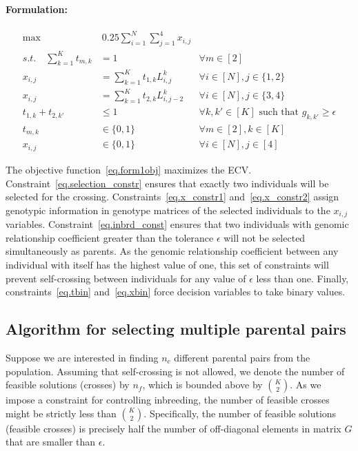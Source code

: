 \documentclass[12pt, a4paper, bibliography=totoc]{scrartcl}
\begin{document}
\paragraph{Formulation:}
\begin{subequations}
\label{form1:single_trait}
		\begin{align}
	\label{eq.form1obj}	\max &\ 0.25\sum_{i=1}^{N}\sum_{j=1}^4 x_{i,j} \\
		\textit{s.t.} \quad 
		 \label{eq.selection_constr}\sum_{k = 1}^K t_{m,k} &= 1  &\forall m \in [2]\\ 
		\label{eq.x_constr1}x_{i,j} &= \sum_{k = 1}^K t_{1,k}L_{i,j}^{k} &  \forall i \in[N], j\in \{1,2\} \\
		\label{eq.x_constr2}x_{i,j} &= \sum_{k = 1}^K t_{2,k}L_{i,j-2}^{k} & \forall i \in[N], j\in \{3,4\}\\
		  \label{eq.inbrd_const}t_{1,k}+t_{2,k'} &\leq 1 &\forall k,k'\in[K] \text{ such that }g_{k,k'}\ge \epsilon\\
		\label{eq.tbin} t_{m,k} &\in \{0,1\} &\forall m\in [2], k \in [K]\\
        \label{eq.xbin} x_{i,j} &\in \{0,1\} &\forall i\in [N], j \in [4]
		\end{align}
\end{subequations}

The objective function~\eqref{eq.form1obj} maximizes the ECV. Constraint~\eqref{eq.selection_constr} ensures that exactly two individuals will be selected for the crossing. Constraints~\eqref{eq.x_constr1} and~\eqref{eq.x_constr2}  assign genotypic information in genotype matrices of the selected individuals to the $x_{i,j}$ variables. Constraint~\eqref{eq.inbrd_const} ensures that  two individuals with genomic relationship coefficient greater than the tolerance $\epsilon$ will not be selected simultaneously as parents. As the genomic relationship coefficient between any individual with itself has the highest value of one, this set of constraints will prevent self-crossing between individuals for any value of $\epsilon$ less than one. Finally, constraints~\eqref{eq.tbin} and~\eqref{eq.xbin} force decision variables to take binary values.

\subsection*{Algorithm for selecting  multiple parental pairs}

Suppose we are interested in finding $n_{c}$ different parental pairs from the population. Assuming that self-crossing is not allowed, we denote the number of feasible solutions (crosses) by $n_f$, which is bounded above by $\binom{K}{2}$. As we impose a constraint for controlling inbreeding, the number of feasible crosses might be strictly less than $\binom{K}{2}$. Specifically, the number of feasible solutions (feasible crosses) is precisely half the number of off-diagonal elements in matrix $G$ that are smaller than $\epsilon$.
\end{document}

